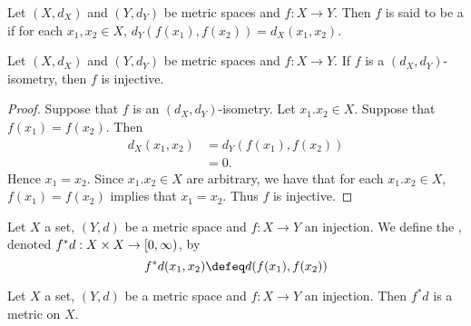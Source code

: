 \documentclass{book}
\begin{document}
\begin{defn} 
	Let $(X, d_X)$ and $(Y, d_Y)$ be metric spaces and $f:X \rightarrow Y$. Then $f$ is said to be a  if for each $x_1, x_2 \in X$, $d_Y(f(x_1), f(x_2)) = d_X(x_1, x_2)$. 
\end{defn}

\begin{ex} 
	Let $(X, d_X)$ and $(Y, d_Y)$ be metric spaces and $f:X \rightarrow Y$. If $f$ is a $(d_X, d_Y)$-isometry, then $f$ is injective.
\end{ex}

\begin{proof}
	Suppose that $f$ is an $(d_X, d_Y)$-isometry. Let $x_1. x_2 \in X$. Suppose that $f(x_1) = f(x_2)$. Then 
	\begin{align*}
		d_X(x_1, x_2)
		& = d_Y(f(x_1), f(x_2)) \\
		& = 0.
	\end{align*}
	Hence $x_1 = x_2$. Since $x_1. x_2 \in X$ are arbitrary, we have that for each $x_1. x_2 \in X$, $f(x_1) = f(x_2)$ implies that $x_1 = x_2$. Thus $f$ is injective. 
\end{proof}

\begin{defn} 
	Let $X$ a set, $(Y, d)$ be a metric space and $f:X \rightarrow Y$ an injection. We define the , denoted $f^*d: X \times X \rightarrow [0,\infty)$, by 
	$$f^*d(x_1, x_2) \defeq d(f(x_1), f(x_2))$$ 
\end{defn}

\begin{ex} 
	Let $X$ a set, $(Y, d)$ be a metric space and $f:X \rightarrow Y$ an injection. Then $f^*d$ is a metric on $X$.
\end{ex}
\end{document}
